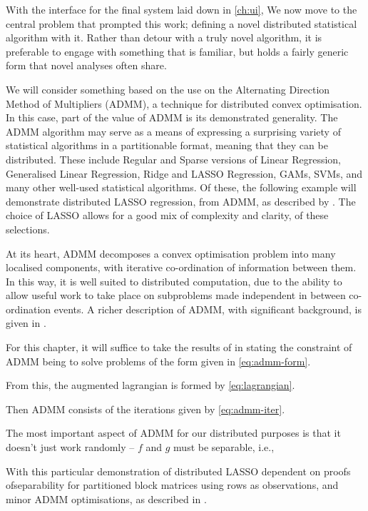 With the interface for the final system laid down in \cref{ch:ui}, We now move to the central problem that prompted this work; defining a novel distributed statistical algorithm with it.
Rather than detour with a truly novel algorithm, it is preferable to engage with something that is familiar, but holds a fairly generic form that novel analyses often share.

We will consider something based on the use on the Alternating Direction Method of Multipliers (ADMM), a technique for distributed convex optimisation.
In this case, part of the value of ADMM is its demonstrated generality.
The ADMM algorithm may serve as a means of expressing a surprising variety of statistical algorithms in a partitionable format, meaning that they can be distributed.
These include Regular and Sparse versions of Linear Regression, Generalised Linear Regression, Ridge and LASSO Regression, GAMs, SVMs, and many other well-used statistical algorithms.
Of these, the following example will demonstrate distributed LASSO regression, from ADMM, as described by \textcite{mateos2010}.
The choice of LASSO allows for a good mix of complexity and clarity, of these selections.

At its heart, ADMM decomposes a convex optimisation problem into many localised components, with iterative co-ordination of information between them.
In this way, it is well suited to distributed computation, due to the ability to allow useful work to take place on subproblems made independent in between co-ordination events.
A richer description of ADMM, with significant background, is given in \textcite{boyd2011}.

For this chapter, it will suffice to take the results of \textcite{boyd2011} in stating the constraint of ADMM being to solve problems of the form given in \cref{eq:admm-form}.


From this, the augmented lagrangian is formed by \cref{eq:lagrangian}.


Then ADMM consists of the iterations given by \cref{eq:admm-iter}.


The most important aspect of ADMM for our distributed purposes is that it doesn't just work randomly -- \(f\) and \(g\) must be separable, i.e.,


With this particular demonstration of distributed LASSO dependent on proofs ofseparability for partitioned block matrices using rows as observations, and minor ADMM optimisations, as described in \textcite{boyd2011}.


